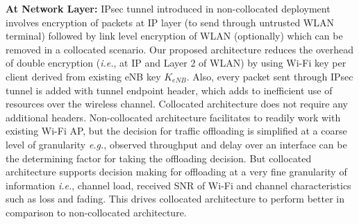 \documentclass[conference]{IEEEtran}
\begin{document}
\textbf{At Network Layer:} 
IPsec tunnel introduced in non-collocated deployment involves encryption of packets at IP layer (to send through untrusted WLAN terminal) followed by link level encryption of WLAN (optionally) which can be removed in a collocated scenario. Our proposed architecture reduces the overhead of double encryption (\emph{i.e.}, at IP and Layer 2 of WLAN) by using Wi-Fi key per client derived from existing eNB key $K_{eNB}$. Also, every packet sent through IPsec tunnel is added with tunnel endpoint header, which adds to inefficient use of resources over the wireless channel. Collocated architecture does not require any additional headers. Non-collocated architecture facilitates to readily work with existing Wi-Fi AP, but the decision for traffic offloading is simplified at a coarse level of granularity \emph{e.g.}, observed throughput and delay over an interface can be the determining factor for taking the offloading decision. But collocated architecture supports decision making for offloading at a very fine granularity of information  \emph{i.e.}, channel load, received SNR of Wi-Fi and channel characteristics such as loss and fading. This drives collocated architecture to perform better in comparison to non-collocated architecture.







\end{document}
